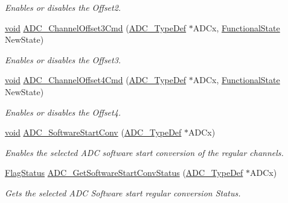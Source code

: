 \begin{DoxyCompactItemize}
\begin{DoxyCompactList}\small\item\em Enables or disables the Offset2. \end{DoxyCompactList}\item 
\hyperlink{group___n_a_m_e_ga18028b8badbf1ea7e704ccac3c488e82}{void} \hyperlink{group___a_d_c___group4_gabcb4e23ba0d4f11932797debfffafcb6}{A\-D\-C\-\_\-\-Channel\-Offset3\-Cmd} (\hyperlink{struct_a_d_c___type_def}{A\-D\-C\-\_\-\-Type\-Def} $\ast$A\-D\-Cx, \hyperlink{group___exported__types_gac9a7e9a35d2513ec15c3b537aaa4fba1}{Functional\-State} New\-State)
\begin{DoxyCompactList}\small\item\em Enables or disables the Offset3. \end{DoxyCompactList}\item 
\hyperlink{group___n_a_m_e_ga18028b8badbf1ea7e704ccac3c488e82}{void} \hyperlink{group___a_d_c___group4_gac74f1f331da6e7ec619c84b2332c5cc1}{A\-D\-C\-\_\-\-Channel\-Offset4\-Cmd} (\hyperlink{struct_a_d_c___type_def}{A\-D\-C\-\_\-\-Type\-Def} $\ast$A\-D\-Cx, \hyperlink{group___exported__types_gac9a7e9a35d2513ec15c3b537aaa4fba1}{Functional\-State} New\-State)
\begin{DoxyCompactList}\small\item\em Enables or disables the Offset4. \end{DoxyCompactList}\item 
\hyperlink{group___n_a_m_e_ga18028b8badbf1ea7e704ccac3c488e82}{void} \hyperlink{group___a_d_c___group4_gac1cd466e725595812c1bbfdad2459ff1}{A\-D\-C\-\_\-\-Software\-Start\-Conv} (\hyperlink{struct_a_d_c___type_def}{A\-D\-C\-\_\-\-Type\-Def} $\ast$A\-D\-Cx)
\begin{DoxyCompactList}\small\item\em Enables the selected A\-D\-C software start conversion of the regular channels. \end{DoxyCompactList}\item 
\hyperlink{group___exported__types_ga89136caac2e14c55151f527ac02daaff}{Flag\-Status} \hyperlink{group___a_d_c___group4_gaf1119583782ecbcec380efcb7eb74883}{A\-D\-C\-\_\-\-Get\-Software\-Start\-Conv\-Status} (\hyperlink{struct_a_d_c___type_def}{A\-D\-C\-\_\-\-Type\-Def} $\ast$A\-D\-Cx)
\begin{DoxyCompactList}\small\item\em Gets the selected A\-D\-C Software start regular conversion Status. \end{DoxyCompactList}\item 

\end{DoxyCompactItemize}

